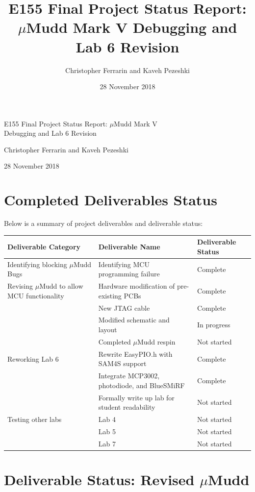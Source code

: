 \documentclass[12pt]{article}
\title{E155 Final Project Status Report: $\mu$Mudd Mark V Debugging and Lab 6 Revision}
\author{Christopher Ferrarin and Kaveh Pezeshki}
\date{28 November 2018}
\begin{document}
	\begin{LARGE}
	\noindent
		E155 
		Final 
		Project 
		Status
		Report: 
		$\mu$Mudd 
		Mark V \\
		Debugging 
		and 
		Lab 
		6 
		Revision
	\end{LARGE}

	\vspace{0.2cm}
	
	\begin{large}
	Christopher Ferrarin and Kaveh Pezeshki
	
	28 November 2018
	\end{large}

\section{Completed Deliverables Status}
Below is a summary of project deliverables and deliverable status:

	\begin{center}
	\begin{tabular}{p{6cm}p{5cm}p{4cm}}
	Deliverable Category & Deliverable Name & Deliverable Status\\
	\hline
	Identifying blocking $\mu$Mudd Bugs & Identifying MCU programming failure & Complete \\
	Revising $\mu$Mudd to allow MCU functionality & Hardware modification of pre-existing PCBs & Complete \\
	& New JTAG cable & Complete \\
	& Modified schematic and layout & In progress \\
	& Completed  $\mu$Mudd respin & Not started \\
	Reworking Lab 6 & Rewrite EasyPIO.h with SAM4S support & Complete \\
	& Integrate MCP3002, photodiode, and BlueSMiRF & Complete \\
	& Formally write up lab for student readability & Not started \\
	Testing other labs & Lab 4 & Not started \\
	& Lab 5 & Not started \\
	& Lab 7 & Not started
	\end{tabular}
	\end{center}

\section{Deliverable Status: Revised $\mu$Mudd}
\end{document}
